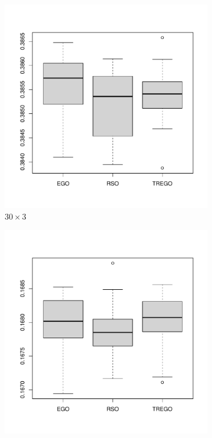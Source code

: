 \documentclass [PhD] {package/uclathes}
\begin{document}
\begin{figure}%
\centering
\begin{subfigure}[b]{.3\textwidth}
\includegraphics[]{chapters/RSO/pdfs/box30x3}
\caption{$30\times 3$}
\end{subfigure}
\begin{subfigure}[b]{.3\textwidth}
\centering
\includegraphics[]{chapters/RSO/pdfs/box50x5}

\end{subfigure}
\end{figure}
\end{document}
